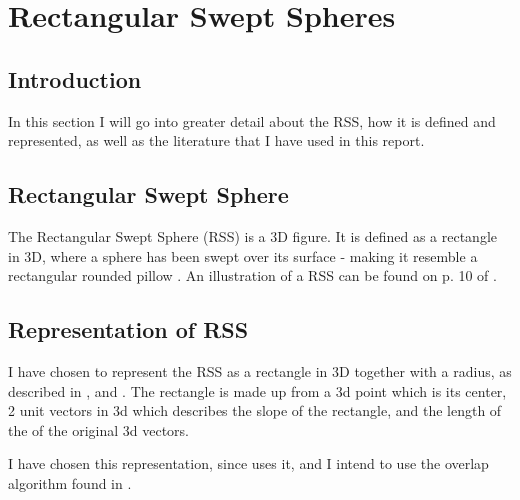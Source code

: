 
\section{Rectangular Swept Spheres}
\label{rss}

\subsection{Introduction}
In this section I will go into greater detail about the RSS, how it is defined and represented, as well as the literature that I have used in this report.

\subsection{Rectangular Swept Sphere}
The Rectangular Swept Sphere (RSS) is a 3D figure. It is defined as a rectangle in 3D, where a sphere has been swept over its surface - making it resemble a rectangular rounded pillow . An illustration of a RSS can be found on p. 10 of \cite{Larsen99fastproximity}. 

\subsection{Representation of RSS}
I have chosen to represent the RSS as a rectangle in 3D together with a radius, as described in \cite{larsen00fast}, \cite{Larsen99fastproximity} and \cite{237244}. The rectangle is made up from a 3d point which is its center, 2 unit vectors in 3d which describes the slope  of the rectangle, and the length of the of the original 3d vectors.

I have chosen this representation, since \cite{327244} uses it, and I intend to use the overlap algorithm found in \cite{237244}.


